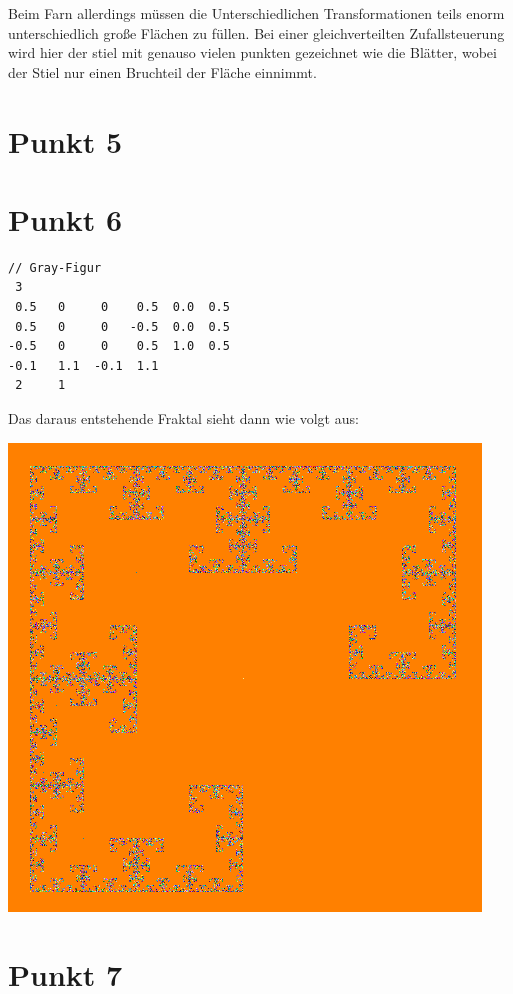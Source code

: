 \documentclass[10pt,a4paper]{article}
\begin{document}
Beim Farn allerdings müssen die Unterschiedlichen Transformationen teils enorm unterschiedlich große Flächen zu füllen. Bei einer gleichverteilten Zufallsteuerung wird hier der stiel mit genauso vielen punkten gezeichnet wie die Blätter, wobei der Stiel nur einen Bruchteil der Fläche einnimmt.

\section{Punkt 5}

\section{Punkt 6}
\begin{lstlisting}
// Gray-Figur
 3
 0.5   0     0    0.5  0.0  0.5
 0.5   0     0   -0.5  0.0  0.5
-0.5   0     0    0.5  1.0  0.5
-0.1   1.1  -0.1  1.1
 2     1
\end{lstlisting}

Das daraus entstehende Fraktal sieht dann wie volgt aus:

\begin{center}
	\includegraphics[scale=0.5]{images/IFS-GRAY.png}
	\label{fig:prim}
\end{center}

\section{Punkt 7}
\end{document}
